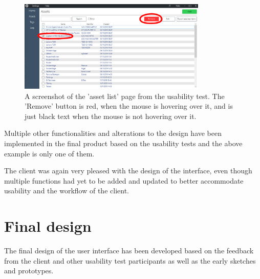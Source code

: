 \begin{figure}[H]
    \centering
    \includegraphics[width=0.8\textwidth]{figures/PicturesOfTheSystem/Usabilitytest_AssetList.png}
    \caption{A screenshot of the 'asset list' page from the usability test. The 'Remove' button is red, when the mouse is hovering over it, and is just black text when the mouse is not hovering over it.}
    \label{fig:UsabilityTestsAssetListPage}
\end{figure}

Multiple other functionalities and alterations to the design have been implemented in the final product based on the usability tests and the above example is only one of them.
\par
The client was again very pleased with the design of the interface, even though multiple functions had yet to be added and updated to better accommodate usability and the workflow of the client.

\section{Final design}
The final design of the user interface has been developed based on the feedback from the client and other usability test participants as well as the early sketches and prototypes.

